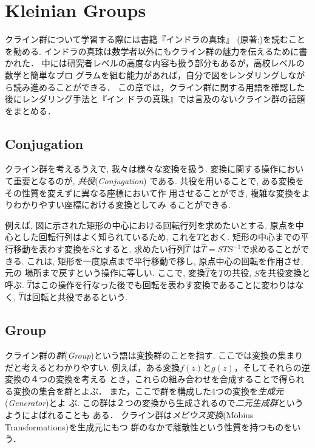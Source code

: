
\section{Kleinian Groups}

クライン群について学習する際には書籍『インドラの真珠』\cite{komori-indra201303}
(原著:\cite{MumfordSeriesWright200204})を読むことを勧める.
インドラの真珠は数学者以外にもクライン群の魅力を伝えるために書かれた．
中には研究者レベルの高度な内容も扱う部分もあるが，高校レベルの数学と簡単なプロ
グラムを組む能力があれば，自分で図をレンダリングしながら読み進めることができる．
この章では，クライン群に関する用語を確認した後にレンダリング手法と『イン
ドラの真珠』では言及のないクライン群の話題をまとめる．

\subsection{Conjugation}

クライン群を考えるうえで, 我々は様々な変換を扱う.
変換に関する操作において重要となるのが, \emph{共役}(\textit{Conjugation})
である.
共役を用いることで, ある変換をその性質を変えずに異なる座標において作
用させることができ, 複雑な変換をよりわかりやすい座標における変換としてみ
ることができる.

例えば, 図に示された矩形の中心における回転行列を求めたいとする.
原点を中心とした回転行列はよく知られているため, これを$T$とおく.
矩形の中心までの平行移動を表わす変換を$S$とすると, 求めたい行列$\hat{T}$
は$\hat{T} = STS^{-1}$で求めることができる.
これは, 矩形を一度原点まで平行移動で移し, 原点中心の回転を作用させ, 元の
場所まで戻すという操作に等しい.
ここで, 変換$\hat{T}$を$T$の共役, $S$を共役変換と呼ぶ.
$\hat{T}$はこの操作を行なった後でも回転を表わす変換であることに変わりはなく,
$\hat{T}$は回転と共役であるという.

\subsection{Group}

クライン群の\emph{群}(\textit{Group})という語は変換群のことを指す.
ここでは変換の集まりだと考えるとわかりやすい.
例えば，ある変換$f(z)$と$g(z)$，そしてそれらの逆変換の４つの変換を考える
とき，これらの組み合わせを合成することで得られる変換の集合を群とよぶ．
また，ここで群を構成した4つの変換を\emph{生成元}(\textit{Generator})とよ
ぶ.
この群は２つの変換から生成されるので\emph{二元生成群}というようによばれることも
ある．
クライン群は\emph{メビウス変換}(M\"obius Transformations)を生成元にもつ
群のなかで離散性という性質を持つものをいう．

